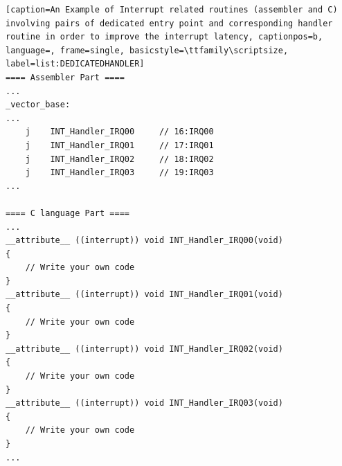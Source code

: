 \begin{lstlisting}[caption=An Example of Interrupt related routines (assembler and C) involving pairs of dedicated entry point and corresponding handler routine in order to improve the interrupt latency, captionpos=b, language=, frame=single, basicstyle=\ttfamily\scriptsize, label=list:DEDICATEDHANDLER]
==== Assembler Part ====
...
_vector_base:
...
    j    INT_Handler_IRQ00     // 16:IRQ00
    j    INT_Handler_IRQ01     // 17:IRQ01
    j    INT_Handler_IRQ02     // 18:IRQ02
    j    INT_Handler_IRQ03     // 19:IRQ03
...

==== C language Part ====
...
__attribute__ ((interrupt)) void INT_Handler_IRQ00(void)
{
    // Write your own code
}
__attribute__ ((interrupt)) void INT_Handler_IRQ01(void)
{
    // Write your own code
}
__attribute__ ((interrupt)) void INT_Handler_IRQ02(void)
{
    // Write your own code
}
__attribute__ ((interrupt)) void INT_Handler_IRQ03(void)
{
    // Write your own code
}
...
\end{lstlisting}


